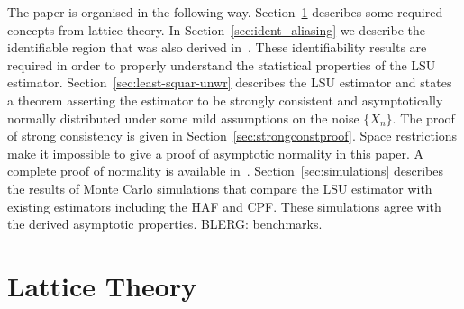 \documentclass[journal]{IEEEtran}
\begin{document}
The paper is organised in the following way. Section~\ref{sec:lattice-theory} describes some required concepts from lattice theory.  In Section~\ref{sec:ident_aliasing} we describe the identifiable region that was also derived in~\cite{McKilliam2009IndentifiabliltyAliasingPolyphase}.  These identifiability results are required in order to properly understand the statistical properties of the LSU estimator.  Section~\ref{sec:least-squar-unwr} describes the LSU estimator and states a theorem asserting the estimator to be strongly consistent and asymptotically normally distributed under some mild assumptions on the noise $\{X_n\}$. The proof of strong consistency is given in Section~\ref{sec:strongconstproof}.  Space restrictions make it impossible to give a proof of asymptotic normality in this paper.  A complete proof of normality is available in~\cite{McKilliam_arxiv_pps_unwrapping_2012}.  Section~\ref{sec:simulations} describes the results of Monte Carlo simulations that compare the LSU estimator with existing estimators including the HAF and CPF.  These simulations agree with the derived asymptotic properties. BLERG: benchmarks.




\section{Lattice Theory}\label{sec:lattice-theory}
\end{document}
